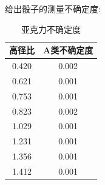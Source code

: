 \documentclass[UTF8]{gapd}
\begin{document}
给出骰子的测量不确定度:

\begin{table}[h]
	\centering
\begin{tabular}{cc}
  \toprule[1.5pt]
  高径比  & A类不确定度 \\
  \midrule[0.75pt]
  0.420 & 0.002 \\
  0.621 & 0.001 \\
  0.753 & 0.001 \\
  0.823 & 0.002 \\
  1.029 & 0.001 \\
  1.231 & 0.001 \\
  1.356 & 0.001 \\
  1.412 & 0.001 \\
  \bottomrule[1.5pt]
\end{tabular}
\caption{亚克力不确定度}
\end{table}
\end{document}
